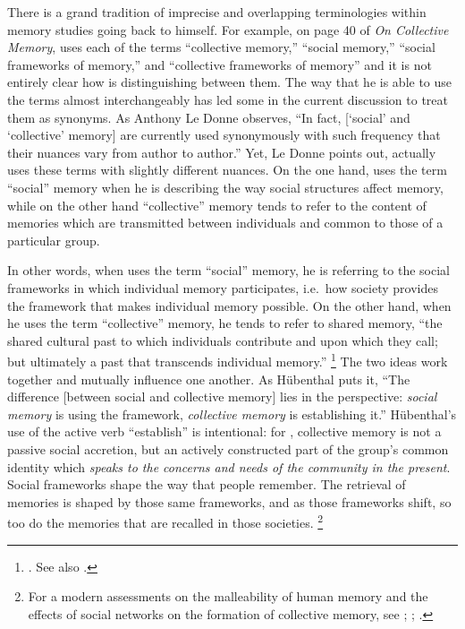 There is a grand tradition of imprecise and overlapping terminologies within memory studies going back to \halbwachs himself. For example, on page 40 of \emph{On Collective Memory}, \halbwachs uses each of the terms ``collective memory,'' ``social memory,'' ``social frameworks of memory,'' and ``collective frameworks of memory'' and it is not entirely clear how \halbwachs is distinguishing between them. The way that he is able to use the terms almost interchangeably has led some in the current discussion to treat them as synonyms. As Anthony Le Donne observes, ``In fact, {[}`social' and `collective' memory{]} are currently used synonymously with such frequency that their nuances vary from author to author.''\autocite[42 n.8]{ledonne2009} Yet, Le Donne points out, \halbwachs actually uses these terms with slightly different nuances. On the one hand, \halbwachs uses the term ``social'' memory when he is describing the way social structures affect memory, while on the other hand ``collective'' memory tends to refer to the content of memories which are transmitted between individuals and common to those of a particular group.  

In other words, when \halbwachs uses the term ``social'' memory, he is referring to the social frameworks in which individual memory participates, i.e.~how society provides the framework that makes individual memory possible.\autocite[180]{hubenthal_carstens-hasselbalch2012} On the other hand, when he uses the term ``collective'' memory, he tends to refer to shared memory, ``the shared cultural past to which individuals contribute and upon which they call; but ultimately a past that transcends individual memory.''%
%
\footnote{\Cite[360]{keith_ec2015}. See also \cite[180]{hubenthal_carstens-hasselbalch2012}.}
%
The two ideas work together and mutually influence one another. As Hübenthal puts it, ``The difference [between social and collective memory] lies in the perspective: \emph{social memory} is using the framework, \emph{collective memory} is establishing it.''\autocite[180.]{hubenthal_carstens-hasselbalch2012} Hübenthal's use of the active verb ``establish'' is intentional: for \halbwachs, collective memory is not a passive social accretion, but an actively constructed part of the group's common identity which \emph{speaks to the concerns and needs of the community in the present}. Social frameworks shape the way that people remember. The retrieval of memories is shaped by those same frameworks, and as those frameworks shift, so too do the memories that are recalled in those societies.%
%
\footnote{For a modern assessments on the malleability of human memory and the effects of social networks on the formation of collective memory, see \cite{coman-etal_pnas2016}; \cite{yamashiro-hirst_jarmc2014}; \cite{coman-etal_yang-etal2012}.}
%

